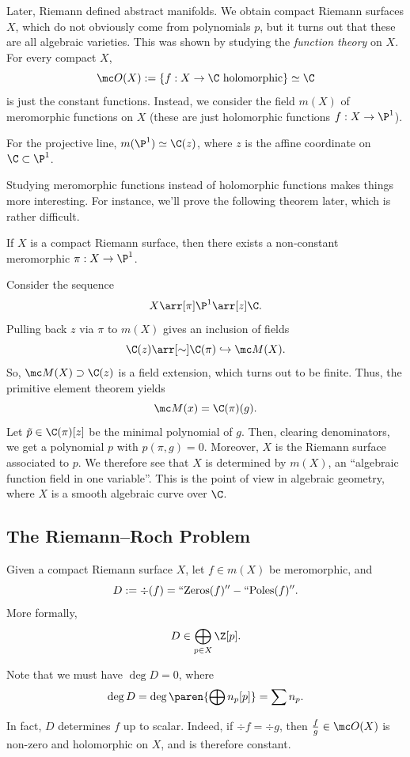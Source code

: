 \documentclass[11pt]{report}
\begin{document}
Later, Riemann defined abstract manifolds. We obtain compact Riemann surfaces $X$, which do not obviously come from polynomials $p$, but it turns out that these are all algebraic varieties. This was shown by studying the \textit{function theory} on $X$. For every compact $X$,
$$\mc O(X) := \{ f:X \to \C \text{ holomorphic}\} \simeq \C$$
is just the constant functions. Instead, we consider the field $m(X)$ of meromorphic functions on $X$ (these are just holomorphic functions $f:X \to \P^1$).

\begin{ex}
    For the projective line, $m(\P^1) \simeq \C(z)$, where $z$ is the affine coordinate on $\C \subset \P^1$.
\end{ex}

Studying meromorphic functions instead of holomorphic functions makes things more interesting. For instance, we'll prove the following theorem later, which is rather difficult.
\begin{thm}
    If $X$ is a compact Riemann surface, then there exists a non-constant meromorphic $\pi : X \to \P^1$.
\end{thm}

Consider the sequence
$$X \arr[\pi] \P^1 \arr[z]\C.$$
Pulling back $z$ via $\pi$ to $m(X)$ gives an inclusion of fields
$$\C(z) \arr[\sim] \C(\pi) \hookrightarrow \mc M(X).$$
So, $\mc M(X) \supset \C(z)$ is a field extension, which turns out to be finite. Thus, the primitive element theorem yields
$$\mc M(x) = \C(\pi)(g).$$
Let $\tilde p \in \C(\pi)[z]$ be the minimal polynomial of $g$. Then, clearing denominators, we get a polynomial $p$ with $p(\pi,g)=0$. Moreover, $X$ is the Riemann surface associated to $p$. We therefore see that $X$ is determined by $m(X)$, an ``algebraic function field in one variable''. This is the point of view in algebraic geometry, where $X$ is a smooth algebraic curve over $\C$.

\subsection{The Riemann--Roch Problem}

Given a compact Riemann surface $X$, let $f \in m(X)$ be meromorphic, and
$$D:=\div (f) = \text{``Zeros}(f)'' - ``\text{Poles}(f)''.$$
More formally,
$$D \in \bigoplus_{p \in X}\Z[p].$$

Note that we must have $\deg D=0$, where
$$\deg D = \deg \paren{\bigoplus n_p[p]}=\sum n_p.$$

In fact, $D$ determines $f$ up to scalar. Indeed, if $\div f = \div g$, then $\frac{f}{g} \in \mc O(X)$ is non-zero and holomorphic on $X$, and is therefore constant.
\end{document}
